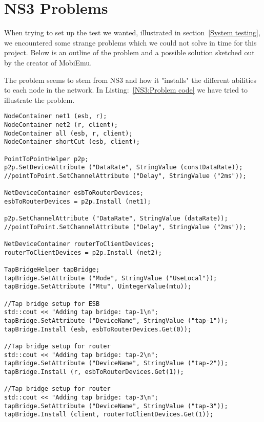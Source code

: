 \section{NS3 Problems}\label{NS3 Problems}
	When trying to set up the test we wanted, illustrated in section~\ref{System testing}, we encountered some strange problems which we could not solve in time for this project. Below is an outline of the problem and a possible solution sketched out by the creator of \gls{MobiEmu}.
	
	The problem seems to stem from NS3 and how it "installs" the different abilities to each node in the network. In Listing:~\ref{NS3:Problem code} we have tried to illustrate the problem.
	
\lstset{language=C++, style=eclipse}
\begin{lstlisting}[frame=single, caption={This code snippet does not work}, label=NS3:Problem code, breaklines=true]
NodeContainer net1 (esb, r);
NodeContainer net2 (r, client);
NodeContainer all (esb, r, client);
NodeContainer shortCut (esb, client);

PointToPointHelper p2p;
p2p.SetDeviceAttribute ("DataRate", StringValue (constDataRate));
//pointToPoint.SetChannelAttribute ("Delay", StringValue ("2ms"));

NetDeviceContainer esbToRouterDevices;
esbToRouterDevices = p2p.Install (net1);

p2p.SetChannelAttribute ("DataRate", StringValue (dataRate));
//pointToPoint.SetChannelAttribute ("Delay", StringValue ("2ms"));

NetDeviceContainer routerToClientDevices;
routerToClientDevices = p2p.Install (net2);

TapBridgeHelper tapBridge;
tapBridge.SetAttribute ("Mode", StringValue ("UseLocal"));
tapBridge.SetAttribute ("Mtu", UintegerValue(mtu)); 

//Tap bridge setup for ESB
std::cout << "Adding tap bridge: tap-1\n";
tapBridge.SetAttribute ("DeviceName", StringValue ("tap-1"));
tapBridge.Install (esb, esbToRouterDevices.Get(0));

//Tap bridge setup for router
std::cout << "Adding tap bridge: tap-2\n";
tapBridge.SetAttribute ("DeviceName", StringValue ("tap-2"));
tapBridge.Install (r, esbToRouterDevices.Get(1));

//Tap bridge setup for router
std::cout << "Adding tap bridge: tap-3\n";
tapBridge.SetAttribute ("DeviceName", StringValue ("tap-3"));
tapBridge.Install (client, routerToClientDevices.Get(1));
\end{lstlisting}
	
